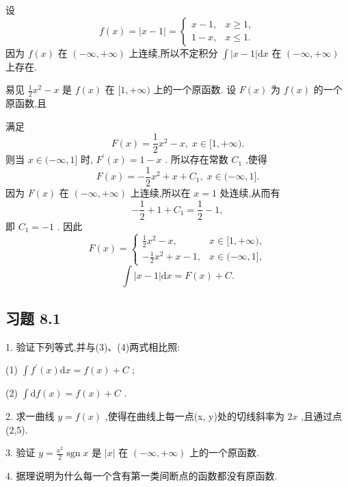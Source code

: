 \begin{solution}

\end{solution}
设
\[
f\left( x\right)  = \left| {x - 1}\right|  = \left\{  \begin{array}{ll} x - 1, & x \geq  1, \\  1 - x, & x \leq  1. \end{array}\right.
\]
因为 \(f\left( x\right)\) 在 \(\left( {-\infty , + \infty }\right)\) 上连续,所以不定积分 \(\int \left| {x - 1}\right| \mathrm{d}x\) 在 \(\left( {-\infty , + \infty }\right)\) 上存在.

易见 \(\frac{1}{2}{x}^{2} - x\) 是 \(f\left( x\right)\) 在 \(\lbrack 1, + \infty )\) 上的一个原函数. 设 \(F\left( x\right)\) 为 \(f\left( x\right)\) 的一个原函数,且

满足
\[
F\left( x\right)  = \frac{1}{2}{x}^{2} - x,\;x \in  \lbrack 1, + \infty ).
\]
则当 \(x \in  ( - \infty ,1\rbrack\) 时, \({F}^{\prime }\left( x\right)  = 1 - x\) . 所以存在常数 \({C}_{1}\) ,使得
\[
F\left( x\right)  =  - \frac{1}{2}{x}^{2} + x + {C}_{1},\;x \in  ( - \infty ,1\rbrack .
\]
因为 \(F\left( x\right)\) 在 \(\left( {-\infty , + \infty }\right)\) 上连续,所以在 \(x = 1\) 处连续,从而有
\[
- \frac{1}{2} + 1 + {C}_{1} = \frac{1}{2} - 1,
\]
即 \({C}_{1} =  - 1\) . 因此
\[
F\left( x\right)  = \left\{  \begin{array}{ll} \frac{1}{2}{x}^{2} - x, & x \in  \lbrack 1, + \infty ), \\   - \frac{1}{2}{x}^{2} + x - 1, & x \in  ( - \infty ,1\rbrack , \end{array}\right.
\]
\[
\int \left| {x - 1}\right| \mathrm{d}x = F\left( x\right)  + C.
\]
\subsection{习题 8.1}

1. 验证下列等式,并与(3)、(4)两式相比照:

(1) \(\int {f}^{\prime }\left( x\right) \mathrm{d}x = f\left( x\right)  + C\) ;

(2) \(\int \mathrm{d}f\left( x\right)  = f\left( x\right)  + C\) .

2. 求一曲线 \(y = f\left( x\right)\) ,使得在曲线上每一点(x, y)处的切线斜率为 \({2x}\) ,且通过点(2,5).

3. 验证 \(y = \frac{{x}^{2}}{2}\operatorname{sgn}x\) 是 \(\left| x\right|\) 在 \(\left( {-\infty , + \infty }\right)\) 上的一个原函数.

4. 据理说明为什么每一个含有第一类间断点的函数都没有原函数.

